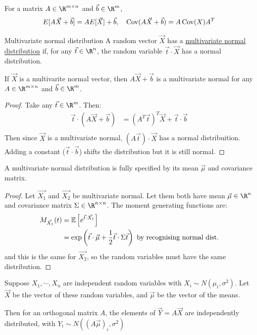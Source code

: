 \documentclass[../Main.tex]{subfiles}
\begin{document}
For a matrix $A \in \R^{m \times n}$ and $\vec{b} \in \R^m$,
\begin{equation*}
    E[A\vec{X} + \vec{b}] = AE[\vec{X}] + \vec{b},\quad \operatorname{Cov}(A\vec{X} + \vec{b}) = A\operatorname{Cov}(X)A^T
\end{equation*}
\begin{definition}{Multivariate normal distribution}
    A random vector $\vec{X}$ has a \underline{multivariate normal distribution} if, for any $\vec{t} \in \R^n$, the random variable $\vec{t} \cdot \vec{X}$ has a normal distribution.
\end{definition}
\begin{proposition}
    If $\vec{X}$ is a multivarite normal vector, then $A\vec{X} + \vec{b}$ is a multivariate normal for any $A \in \R^{m \times n}$ and $\vec{b} \in \R^m$.
    \label{propTransformMVN}
\end{proposition}
\begin{proof}
    Take any $\vec{t} \in \R^m$. Then:
    \begin{align*}
        \vec{t} \cdot \left(A\vec{X} + \vec{b}\right) &= (A^T \vec{t})^T \vec{X} + \vec{t} \cdot \vec{b} \\
    \end{align*}
    Then since $\vec{X}$ is a multivariate normal, $(A\vec{t}) \cdot \vec{X}$ has a normal distribuition. Adding a constant ($\vec{t} \cdot \vec{b}$) shifts the distribution but it is still normal.
\end{proof}
\begin{proposition}
    A multivariate normal distribution is fully specified by its mean $\vec{\mu}$ and covariance matrix.
    \label{propMVNParameters}
\end{proposition}
\begin{proof}
    Let $\vec{X_1}$ and $\vec{X_2}$ be multivariate normal. Let them both have mean $\vec{\mu} \in \R^n$ and covariance matrix $\Sigma \in \R^{n \times n}$. The moment generating functions are:
    \begin{align*}
        M_{\vec{X_1}}(t) &= \mathbb{E}\left[e^{\vec{t} \cdot \vec{X_1}}\right] \\
        &= \exp\left(\vec{t} \cdot \vec{\mu} + \frac12 \vec{t} \cdot \Sigma \vec{t}\right) \text{ by recognising normal dist.}
    \end{align*}
    and this is the same for $\vec{X_2}$, so the random variables must have the same distribution.
\end{proof}
\begin{corollary}
    Suppose $X_1, \cdots, X_n$ are independent random variables with $X_i \sim N(\mu_i, \sigma^2)$. Let $\vec{X}$ be the vector of these random variables, and $\vec{\mu}$ be the vector of the means.

    Then for an orthogonal matrix $A$, the elements of $\vec{Y} = A\vec{X}$ are independently distributed, with $Y_i \sim N((A\vec{\mu})_i, \sigma^2)$
    \label{corRotateNormals}
\end{corollary}
\end{document}
